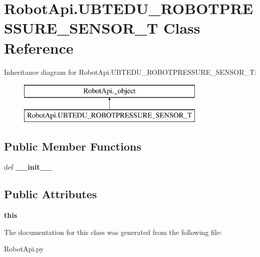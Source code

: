 \hypertarget{classRobotApi_1_1UBTEDU__ROBOTPRESSURE__SENSOR__T}{\section{Robot\+Api.\+U\+B\+T\+E\+D\+U\+\_\+\+R\+O\+B\+O\+T\+P\+R\+E\+S\+S\+U\+R\+E\+\_\+\+S\+E\+N\+S\+O\+R\+\_\+\+T Class Reference}
\label{classRobotApi_1_1UBTEDU__ROBOTPRESSURE__SENSOR__T}
}
Inheritance diagram for Robot\+Api.\+U\+B\+T\+E\+D\+U\+\_\+\+R\+O\+B\+O\+T\+P\+R\+E\+S\+S\+U\+R\+E\+\_\+\+S\+E\+N\+S\+O\+R\+\_\+\+T\+:\begin{figure}[H]
\begin{center}
\leavevmode
\includegraphics[height=2.000000cm]{classRobotApi_1_1UBTEDU__ROBOTPRESSURE__SENSOR__T}
\end{center}
\end{figure}
\subsection*{Public Member Functions}
\begin{DoxyCompactItemize}
\item 
\hypertarget{classRobotApi_1_1UBTEDU__ROBOTPRESSURE__SENSOR__T_a454f0b56ebd0309d9f0e418694e1443f}{def {\bfseries \+\_\+\+\_\+init\+\_\+\+\_\+}}\label{classRobotApi_1_1UBTEDU__ROBOTPRESSURE__SENSOR__T_a454f0b56ebd0309d9f0e418694e1443f}

\end{DoxyCompactItemize}
\subsection*{Public Attributes}
\begin{DoxyCompactItemize}
\item 
\hypertarget{classRobotApi_1_1UBTEDU__ROBOTPRESSURE__SENSOR__T_a3637350305a0ed076e9e5d0ff0506884}{{\bfseries this}}\label{classRobotApi_1_1UBTEDU__ROBOTPRESSURE__SENSOR__T_a3637350305a0ed076e9e5d0ff0506884}

\end{DoxyCompactItemize}


The documentation for this class was generated from the following file\+:\begin{DoxyCompactItemize}
\item 
Robot\+Api.\+py\end{DoxyCompactItemize}
